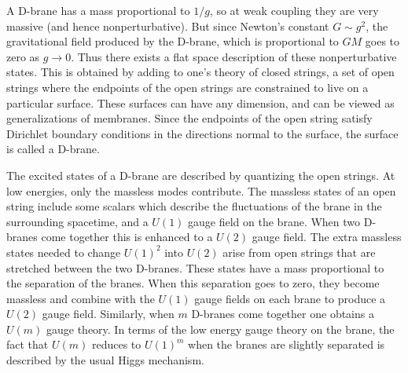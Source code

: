 \documentclass[12pt]{article}
\begin{document}
A D-brane has a mass proportional to $1/g$, so at weak coupling they
are very massive (and hence nonperturbative). But since Newton's constant
$G\sim g^2$, the gravitational field produced by the D-brane, which
is proportional to  $GM$ goes to 
zero as $g\rightarrow 0$. Thus there exists a flat space description of
these nonperturbative states. This is obtained by adding
to one's theory of closed
strings, a set of open strings where the endpoints of the open strings
are constrained to live on a  particular surface. These surfaces can have
any dimension, and can be viewed as generalizations of membranes.
Since the endpoints
of the open string satisfy Dirichlet boundary conditions in the directions
normal to the surface, the surface is called a D-brane. 

The excited states of a D-brane are described by quantizing the
open strings. At low energies, only the massless modes contribute.  The massless
states of an open string include some scalars which describe the fluctuations
of the brane in the surrounding spacetime, and a $U(1)$ gauge field on the
brane.
When two D-branes
come together this is enhanced to a $U(2)$ gauge field. The extra
massless states needed to change $U(1)^2$ into $U(2)$
arise from open strings that are stretched between
the two D-branes. These states have a mass proportional to the
separation of the branes. When this separation goes to zero, they become
massless and combine
with the $U(1)$ gauge fields on each brane to produce a $U(2)$ gauge field.
Similarly, when $m$ D-branes come together one obtains a $U(m)$ gauge
theory.  
In terms of the low energy gauge theory on the brane, the fact that
$U(m)$ reduces to $U(1)^m$ when the branes are slightly separated 
is described by the usual Higgs mechanism. 
\end{document}
